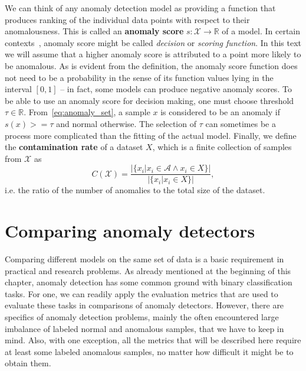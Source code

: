 We can think of any anomaly detection model as providing a function that produces ranking of the individual data points with respect to their anomalousness. This is called an \textbf{anomaly score} $s:\mathcal{X}\rightarrow\mathbb{R}$ of a model. In certain contexts~\cite{pedregosa2011scikit}, anomaly score might be called \textit{decision }or \textit{scoring function}. In this text we will assume that a higher anomaly score is attributed to a point more likely to be anomalous. As is evident from the definition, the anomaly score function does not need to be a probability in the sense of its function values lying in the interval $\left[0,1\right]$ -- in fact, some models can produce negative anomaly scores. To be able to use an anomaly score for decision making, one must choose threshold $\tau\in\mathbb{R}$. From~\eqref{eq:anomaly_set}, a sample $x$ is considered to be an anomaly if $s(x)>=\tau$ and normal otherwise. The selection of $\tau$ can sometimes be a process more complicated than the fitting of the actual model. Finally, we define the \textbf{contamination rate} of a dataset $X$, which is a finite collection of samples from $\mathcal{X}$ as
\begin{equation}\label{eq:contamination_rate}
C(\mathcal{X})=\frac{|\{x_{i}|x_{i}\in \mathcal{A} \wedge x_i \in X \}|}{|\{x_{i}|x_{i}\in X\}|},
\end{equation}
i.e. the ratio of the number of anomalies to the total size of the dataset.

\section{Comparing anomaly detectors}
Comparing different models on the same set of data is a basic requirement in practical and research problems. As already mentioned at the beginning of this chapter, anomaly detection has some common ground with binary classification tasks. For one, we can readily apply the evaluation metrics that are used to evaluate these tasks in comparisons of anomaly detectors. However, there are specifics of anomaly detection problems, mainly the often encountered large imbalance of labeled normal and anomalous samples, that we have to keep in mind. Also, with one exception, all the metrics that will be described here require at least some labeled anomalous samples, no matter how difficult it might be to obtain them.

